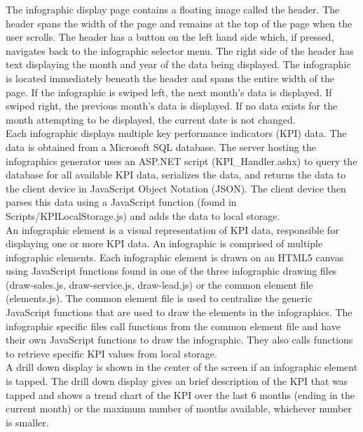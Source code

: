 \documentclass[11pt,a4paper,oneside]{article}
\begin{document}
The infographic display page contains a floating image called the header. The header spans the width of the page and remains at the top of the page when the user scrolls. The header has a button on the left hand side which, if pressed, navigates back to the infographic selector menu. The right side of the header has text displaying the month and year of the data being displayed. The infographic is located immediately beneath the header and spans the entire width of the page. If the infographic is swiped left, the next month's data is displayed. If swiped right, the previous month's data is displayed. If no data exists for the month attempting to be displayed, the current date is not changed.\\


Each infographic displays multiple key performance indicators (KPI) data. The data is obtained from a Microsoft SQL database. The server hosting the infographics generator uses an ASP.NET script (KPI\_Handler.ashx) to query the database for all available KPI data, serializes the data, and returns the data to the client device in JavaScript Object Notation (JSON). The client device then parses this data using a JavaScript function (found in Scripts/KPILocalStorage.js) and adds the data to local storage.\\


An infographic element is a visual representation of KPI data, responsible for displaying one or more KPI data. An infographic is comprised of multiple infographic elements. Each infographic element is drawn on an HTML5 canvas using JavaScript functions found in one of the three infographic drawing files (draw-sales.js, draw-service.js, draw-lead.js) or the common element file (elements.js). The common element file is used to centralize the generic JavaScript functions that are used to draw the elements in the infographics. The infographic specific files call functions from the common element file and have their own JavaScript functions to draw the infographic. They also calls functions to retrieve specific KPI values from local storage.\\


A drill down display is shown in the center of the screen if an infographic element is tapped. The drill down display gives an brief description of the KPI that was tapped and shows a trend chart of the KPI over the last 6 months (ending in the current month) or the maximum number of months available, whichever number is smaller.\\
\end{document}
